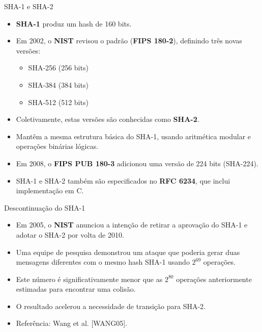 \begin{frame}{SHA-1 e SHA-2}
    \begin{itemize}
        \item \textbf{SHA-1} produz um hash de 160 bits.
        \item Em 2002, o \textbf{NIST} revisou o padrão (\textbf{FIPS 180-2}), definindo três novas versões:
        \begin{itemize}
            \item SHA-256 (256 bits)
            \item SHA-384 (384 bits)
            \item SHA-512 (512 bits)
        \end{itemize}
        \item Coletivamente, estas versões são conhecidas como \textbf{SHA-2}.
        \item Mantêm a mesma estrutura básica do SHA-1, usando aritmética modular e operações binárias lógicas.
        \item Em 2008, o \textbf{FIPS PUB 180-3} adicionou uma versão de 224 bits (SHA-224).
        \item SHA-1 e SHA-2 também são especificados no \textbf{RFC 6234}, que inclui implementação em C.
    \end{itemize}
\end{frame}

\begin{frame}{Descontinuação do SHA-1}
    \begin{itemize}
        \item Em 2005, o \textbf{NIST} anunciou a intenção de retirar a aprovação do SHA-1 e adotar o SHA-2 por volta de 2010.
        \item Uma equipe de pesquisa demonstrou um ataque que poderia gerar duas mensagens diferentes com o mesmo hash SHA-1 usando $2^{69}$ operações.
        \item Este número é significativamente menor que as $2^{80}$ operações anteriormente estimadas para encontrar uma colisão.
        \item O resultado acelerou a necessidade de transição para SHA-2.
        \item Referência: Wang et al. [WANG05].
    \end{itemize}
\end{frame}

